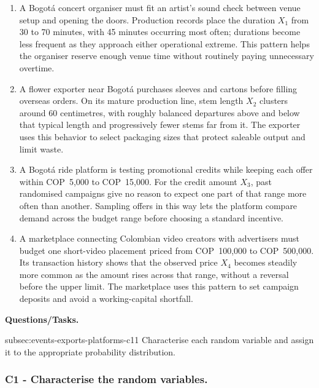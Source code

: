 	\begin{enumerate}
		\item A Bogotá concert organiser must fit an artist's sound check between venue setup and opening the doors. Production records place the duration \(X_1\) from 30 to 70 minutes, with 45 minutes occurring most often; durations become less frequent as they approach either operational extreme. This pattern helps the organiser reserve enough venue time without routinely paying unnecessary overtime.
		\item A flower exporter near Bogotá purchases sleeves and cartons before filling overseas orders. On its mature production line, stem length \(X_2\) clusters around 60 centimetres, with roughly balanced departures above and below that typical length and progressively fewer stems far from it. The exporter uses this behavior to select packaging sizes that protect saleable output and limit waste.
		\item A Bogotá ride platform is testing promotional credits while keeping each offer within COP~5,000 to COP~15,000. For the credit amount \(X_3\), past randomised campaigns give no reason to expect one part of that range more often than another. Sampling offers in this way lets the platform compare demand across the budget range before choosing a standard incentive.
		\item A marketplace connecting Colombian video creators with advertisers must budget one short-video placement priced from COP~100,000 to COP~500,000. Its transaction history shows that the observed price \(X_4\) becomes steadily more common as the amount rises across that range, without a reversal before the upper limit. The marketplace uses this pattern to set campaign deposits and avoid a working-capital shortfall.
	\end{enumerate}

	\textbf{Questions/Tasks.}
	\begin{enumerate}
		\CriterionTask
		{subsec:events-exports-platforms-c1}{1}
		{Characterise each random variable and assign it to the appropriate probability distribution.}
	\end{enumerate}

	\subsubsection*{C1 - Characterise the random variables.}
	\label{subsec:events-exports-platforms-c1}

